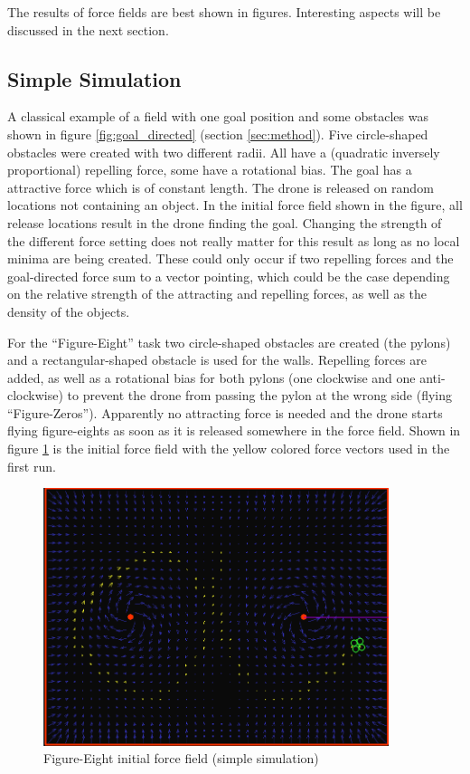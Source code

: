 \documentclass[11pt]{article}
\begin{document}
The results of force fields are best shown in figures. Interesting aspects will be discussed in the next section.


\subsection{Simple Simulation}

A classical example of a field with one goal position and some obstacles was shown in figure \ref{fig:goal_directed} (section \ref{sec:method}). Five circle-shaped obstacles were created with two different radii. All have a (quadratic inversely proportional) repelling force, some have a rotational bias. The goal has a attractive force which is of constant length. The drone is released on random locations not containing an object. In the initial force field shown in the figure, all release locations result in the drone finding the goal. Changing the strength of the different force setting does not really matter for this result as long as no local minima are being created. These could only occur if two repelling forces and the goal-directed force sum to a vector pointing, which could be the case depending on the relative strength of the attracting and repelling forces, as well as the density of the objects.

For the ``Figure-Eight'' task two circle-shaped obstacles are created (the pylons) and a rectangular-shaped obstacle is used for the walls. Repelling forces are added, as well as a rotational bias for both pylons (one clockwise and one anti-clockwise) to prevent the drone from passing the pylon at the wrong side (flying ``Figure-Zeros''). Apparently no attracting force is needed and the drone starts flying figure-eights as soon as it is released somewhere in the force field. Shown in figure \ref{fig:simple_init} is the initial force field with the yellow colored force vectors used in the first run.

  \begin{figure}
    \begin{center}
    \includegraphics[width=0.9\textwidth]{img/sim_init}
    \caption{Figure-Eight initial force field (simple simulation)}
    \label{fig:simple_init}
    \end{center}
  \end{figure}
\end{document}
